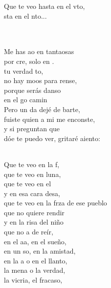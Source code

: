 \documentclass[12pt]{article}
\begin{document}
\begin{multicols*}{2}
\begin{cancion}
\begin{chorus}
	Que te veo hasta en el vto, \\
	sta en el nto...\\
	\end{chorus}%
	\jump\\
	   \\
	Me has ao en tantaosas \\
	por cre, solo en . \\
	 tu verdad to, \\
	no hay moos para rense,\\
	porque  serás danso \\
	en el go camin\\
	Pero un da dejé de barte, \\
	fuiste  quien a mi me enconste, \\
	y si  preguntan que \\
	dóe te puedo ver, gritaré aiento:\\\jump\\
	\begin{chorus}%
	Que te veo en la f, \\
	que te veo en luna,\\
	que te veo en el  \\
	y en esa cara desa,\\
	que te veo en la frza de ese pueblo\\
	que no  quiere rendir\\
	y en la risa del niño \\
	que no a de reír,\\
	en el aa, en el sueño, \\
	en un so, en la amistad,\\
	en la a o en el llanto, \\
	la mena o la verdad,\\
	la vicria, el fracaso, \\

\end{chorus}
\end{cancion}
\end{multicols*}
\end{document}

